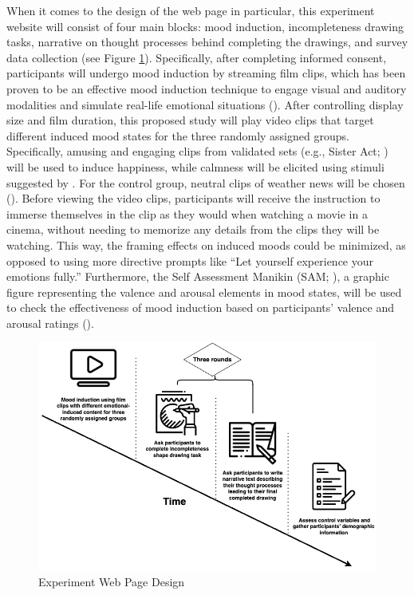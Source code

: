 \documentclass[../Proposal_Writing_Sample.tex]{subfiles}
\begin{document}
When it comes to the design of the web page in particular, this experiment website will consist of four main blocks: mood induction, incompleteness drawing tasks, narrative on thought processes behind completing the drawings, and survey data collection (see Figure \ref{fig: Experiment Web Page Design}). Specifically, after completing informed consent, participants will undergo mood induction by streaming film clips, which has been proven to be an effective mood induction technique to engage visual and auditory modalities and simulate real-life emotional situations (\cite{siedlecka_experimental_2019}). After controlling display size and film duration, this proposed study will play video clips that target different induced mood states for the three randomly assigned groups. Specifically, amusing and engaging clips from validated sets (e.g., Sister Act; \cite{maryam_fakhrhosseini_affectemotion_2017}) will be used to induce happiness, while calmness will be elicited using stimuli suggested by \textcite{kimura_emotional_2019}. For the control group, neutral clips of weather news will be chosen (\cite{siedlecka_experimental_2019}). Before viewing the video clips, participants will receive the instruction to immerse themselves in the clip as they would when watching a movie in a cinema, without needing to memorize any details from the clips they will be watching. This way, the framing effects on induced moods could be minimized, as opposed to using more directive prompts like ``Let yourself experience your emotions fully.'' Furthermore, the Self Assessment Manikin (SAM; \cite{bradley_affect_1999}), a graphic figure representing the valence and arousal elements in mood states, will be used to check the effectiveness of mood induction based on participants' valence and arousal ratings (\cite{kucera_using_2012}).

\begin{figure}
    \centering
    \includegraphics[width=0.7\linewidth, keepaspectratio]{drawio/Experiment Timeline.png}
    \caption{Experiment Web Page Design}
    \label{fig: Experiment Web Page Design}
\end{figure}
\end{document}
